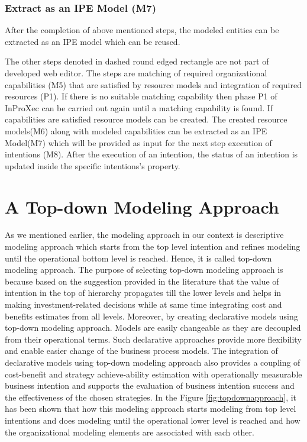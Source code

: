 \subsubsection{Extract as an IPE Model (M7)}  
After the completion of above mentioned steps, the modeled entities can be extracted as an IPE model which can be reused. 

The other steps denoted in dashed round edged rectangle are not part of developed web editor. The steps are matching of required organizational capabilities (M5) that are satisfied by resource models and integration of required resources (P1). If there is no suitable matching capability then phase P1 of InProXec can be carried out again until a matching capability is found. If capabilities are satisfied resource models can be created. The created resource models(M6) along with modeled capabilities can be extracted as an IPE Model(M7) which will be provided as input for the next step execution of intentions (M8). After the execution of an intention, the status of an intention is updated inside the specific intentions's property. 

\section{A Top-down Modeling Approach}
\label{sec:topdownapproach}
As we mentioned earlier, the modeling approach in our context is descriptive modeling approach which starts from the top level intention and refines modeling until the operational bottom level is reached. Hence, it is called top-down modeling approach. The purpose of selecting top-down modeling approach is because based on the suggestion provided in the literature \cite{Mandic2010, Bider2005,Sungur2016} that the value of intention in the top of hierarchy propagates till the lower levels and helps in making investment-related decisions while at same time integrating cost and benefits estimates from all levels. Moreover, by creating declarative models using top-down modeling approach. Models are easily changeable as they are decoupled from their operational terms. Such declarative approaches provide more flexibility and enable easier change of the business process models. The integration of declarative models using top-down modeling approach also provides a coupling of cost-benefit and strategy achieve-ability estimation with operationally measurable business intention and supports the evaluation of business intention success and the effectiveness of the chosen strategies. In the Figure \ref{fig:topdownapproach}, it has been shown that how this modeling approach starts modeling from top level intentions and does modeling until the operational lower level is reached and how the organizational modeling elements are associated with each other. 

